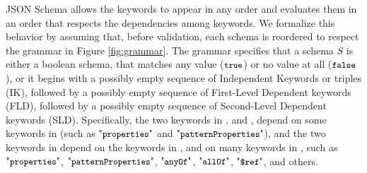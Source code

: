 JSON Schema allows the keywords to appear in any order and evaluates them in an order that
respects the dependencies among keywords.
We formalize this behavior by assuming that,
before validation, each schema is
reordered to respect the grammar in Figure \ref{fig:grammar}.
The grammar specifies that a schema $S$ is either a boolean schema, that matches any value ($\mbox{\tt{\small true}}$) or no value at all ($\mbox{\tt{\small false}}$), or it begins with a 
possibly empty sequence of Independent Keywords or triples (IK), followed by
a possibly empty sequence of First-Level Dependent keywords (FLD), followed by
a possibly empty sequence of Second-Level Dependent keywords (SLD).
%
Specifically, the two keywords in  , {\qaddProps} and {\qits},  
depend on some keywords in
 (such as $\qprops$ and $\qpattProps$),
and the two keywords in   depend on the keywords in , %
and on many keywords in , such as $\qprops$, $\qpattProps$,%
$\qany$, $\qall$, %
$\qdref$, and others.



